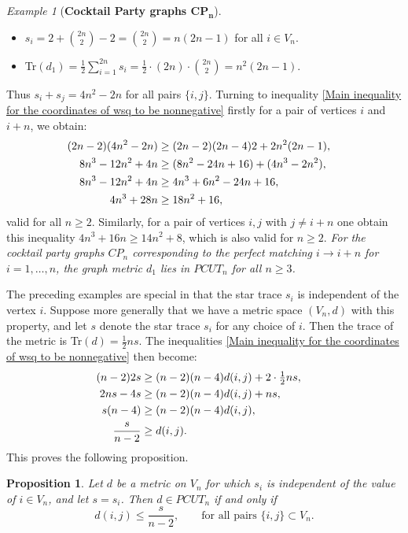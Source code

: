 \documentclass[12pt]{amsart}
\numberwithin{theorem}{section}
\newtheorem{proposition}[theorem]{Proposition}
\theoremstyle{remark}
\newtheorem{example}[theorem]{Example}
\begin{document}
\begin{example}[{\bf Cocktail Party graphs $\mathbf{CP_n}$}]
\begin{itemize}
\item[(i)] $s_i = 2+ {2n\choose 2}-2 = {2n\choose 2} = n (2n-1)$ for all $i\in V_n$.  
\item[(ii)] Tr$(d_1) = \frac{1}{2} \sum _{i=1}^{2n}s_i = \frac{1}{2} \cdot (2n) \cdot {2n\choose 2} =   n^2 (2n-1)$.
\end{itemize} 
Thus $s_i+s_j = 4n^2-2n$ for all pairs $\{i,j\}$. Turning to inequality \eqref{Main inequality for the coordinates of wsq to be nonnegative} firstly for a pair of vertices $i$ and $i+n$, we obtain: 
\begin{align*}
(2n-2)(4n^2-2n) & \ge (2n-2)(2n-4)2 + 2n^2(2n-1), \cr
8n^3-12n^2+4n& \ge  (8n^2-24n+16) + (4n^3-2n^2), \cr
8n^3-12n^2+4n& \ge  4n^3+6n^2-24n+16, \cr
4n^3 +28 n& \ge 18n^2 + 16, 
\end{align*}
valid for all $n\ge 2$. Similarly, for a pair of vertices $i,j$ with $j\ne i+n$ one obtain this inequality $4n^3+16n\ge 14n^2+8$, which is also valid for $n\ge 2$. 
\vskip2mm
 {\em For the cocktail party graphs $CP_n$ corresponding to the perfect matching $i\to i+n$ for $i=1,\dots, n$, the graph metric $d_1$ lies in $PCUT_n$ for all $n\ge 3$.}  
\end{example} 
The preceding examples are special in that the star trace $s_i$ is independent of the vertex $i$. Suppose more generally that we have a metric space $(V_n, d)$ with this property, and let $s$ denote the star trace $s_i$ for any choice of $i$. Then the trace of the metric is Tr$(d) = \frac{1}{2}ns$. The inequalities  \eqref{Main inequality for the coordinates of wsq to be nonnegative} then become:
\begin{align*}
(n-2)2s & \ge\textstyle  (n-2)(n-4)d(i,j) + 2 \cdot \frac{1}{2}ns, \cr 
2ns -4s & \ge\textstyle  (n-2)(n-4)d(i,j) + ns, \cr
s(n -4) & \ge\textstyle  (n-2)(n-4)d(i,j), \cr
\frac{s}{n-2} & \ge d(i,j). 
\end{align*}
This proves the following proposition. 
\begin{proposition} \label{Proposition with constant values of star traces}
Let $d$ be a metric on $V_n$ for which $s_i$ is independent of the value of $i\in V_n$, and let $s=s_i$. Then $d\in PCUT_n$ if and only if 
$$d(i,j) \le \frac{s}{n-2},\qquad \text{for all pairs } \{i,j\}\subset V_n.$$ 
\end{proposition}
\end{document}
